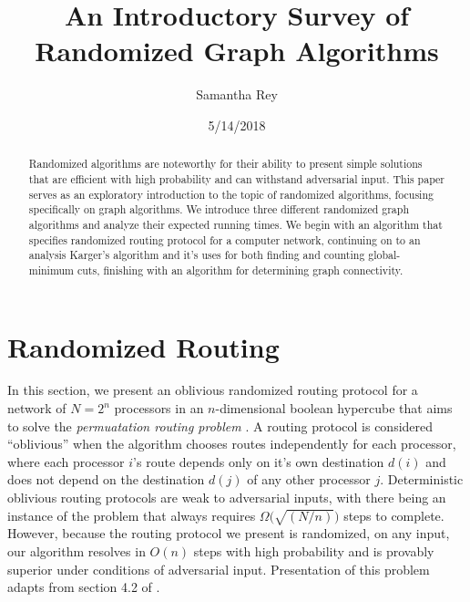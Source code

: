 \documentclass[psamsfonts, 10pt]{amsart}
\title{An Introductory Survey of Randomized Graph Algorithms}
\author{Samantha Rey}
\date{5/14/2018}
\theoremstyle{definition}
\theoremstyle{remark}
\numberwithin{equation}{section}
\begin{document}
\begin{abstract}

Randomized algorithms are noteworthy for their ability to present simple solutions that are efficient with high probability and can withstand adversarial input. This paper serves as an exploratory introduction to the topic of randomized algorithms, focusing specifically on graph algorithms. We introduce three different randomized graph algorithms and analyze their expected running times. We begin with an algorithm that specifies randomized routing protocol for a computer network, continuing on to an analysis Karger's algorithm and it's uses for both finding and counting global-minimum cuts, finishing with an algorithm for determining graph connectivity.

\end{abstract}

\maketitle

\tableofcontents













\section{Randomized Routing} In this section, we present an oblivious randomized routing protocol for a network of $N = 2^n$ processors in an $n$-dimensional boolean hypercube that aims to solve the {\it permuatation routing problem} \cite{randalg}.  A routing protocol is considered ``oblivious'' when the algorithm chooses routes independently for each processor, where each processor $i$'s route depends only on it's own destination $d(i)$ and does not depend on the destination $d(j)$ of any other processor $j$. Deterministic oblivious routing protocols are weak to adversarial inputs, with there being an instance of the problem that always requires $\Omega\Big(\sqrt{(N/n)}\Big)$ steps to complete. However, because the routing protocol we present is randomized, on any input, our algorithm resolves in $O(n)$ steps with high probability and is provably superior under conditions of adversarial input. Presentation of this problem adapts from section 4.2 of \cite{randalg}. \\
\end{document}
